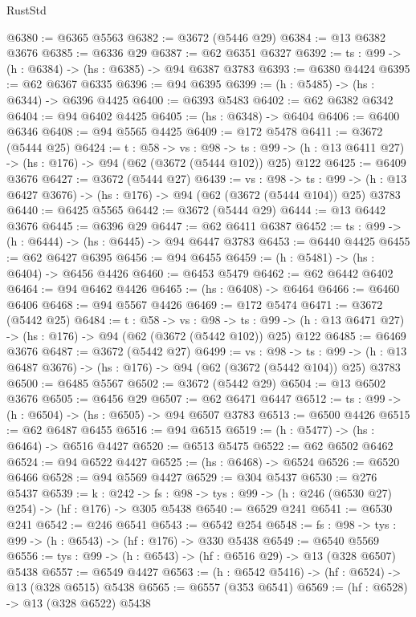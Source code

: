 \begin{lexlean}{RustStd}
\begin{coremodule}
@6380 := @6365 @5563
@6382 := @3672 (@5446 @29)
@6384 := @13 @6382 @3676
@6385 := @6336 @29
@6387 := @62 @6351 @6327
@6392 := {ts : @99} -> (h : @6384) -> (hs : @6385) -> @94 @6387 @3783
@6393 := @6380 @4424
@6395 := @62 @6367 @6335
@6396 := @94 @6395
@6399 := (h : @5485) -> (hs : @6344) -> @6396 @4425
@6400 := @6393 @5483
@6402 := @62 @6382 @6342
@6404 := @94 @6402 @4425
@6405 := (hs : @6348) -> @6404
@6406 := @6400 @6346
@6408 := @94 @5565 @4425
@6409 := @172 @5478
@6411 := @3672 (@5444 @25)
@6424 := {t : @58} ->
  {vs : @98} ->
  {ts : @99} -> (h : @13 @6411 @27) -> (hs : @176) -> @94 (@62 (@3672 (@5444 @102)) @25) @122
@6425 := @6409 @3676
@6427 := @3672 (@5444 @27)
@6439 := {vs : @98} ->
  {ts : @99} -> (h : @13 @6427 @3676) -> (hs : @176) -> @94 (@62 (@3672 (@5444 @104)) @25) @3783
@6440 := @6425 @5565
@6442 := @3672 (@5444 @29)
@6444 := @13 @6442 @3676
@6445 := @6396 @29
@6447 := @62 @6411 @6387
@6452 := {ts : @99} -> (h : @6444) -> (hs : @6445) -> @94 @6447 @3783
@6453 := @6440 @4425
@6455 := @62 @6427 @6395
@6456 := @94 @6455
@6459 := (h : @5481) -> (hs : @6404) -> @6456 @4426
@6460 := @6453 @5479
@6462 := @62 @6442 @6402
@6464 := @94 @6462 @4426
@6465 := (hs : @6408) -> @6464
@6466 := @6460 @6406
@6468 := @94 @5567 @4426
@6469 := @172 @5474
@6471 := @3672 (@5442 @25)
@6484 := {t : @58} ->
  {vs : @98} ->
  {ts : @99} -> (h : @13 @6471 @27) -> (hs : @176) -> @94 (@62 (@3672 (@5442 @102)) @25) @122
@6485 := @6469 @3676
@6487 := @3672 (@5442 @27)
@6499 := {vs : @98} ->
  {ts : @99} -> (h : @13 @6487 @3676) -> (hs : @176) -> @94 (@62 (@3672 (@5442 @104)) @25) @3783
@6500 := @6485 @5567
@6502 := @3672 (@5442 @29)
@6504 := @13 @6502 @3676
@6505 := @6456 @29
@6507 := @62 @6471 @6447
@6512 := {ts : @99} -> (h : @6504) -> (hs : @6505) -> @94 @6507 @3783
@6513 := @6500 @4426
@6515 := @62 @6487 @6455
@6516 := @94 @6515
@6519 := (h : @5477) -> (hs : @6464) -> @6516 @4427
@6520 := @6513 @5475
@6522 := @62 @6502 @6462
@6524 := @94 @6522 @4427
@6525 := (hs : @6468) -> @6524
@6526 := @6520 @6466
@6528 := @94 @5569 @4427
@6529 := @304 @5437
@6530 := @276 @5437
@6539 := {k : @242} ->
  {fs : @98} -> {tys : @99} -> (h : @246 (@6530 @27) @254) -> (hf : @176) -> @305 @5438
@6540 := @6529 @241
@6541 := @6530 @241
@6542 := @246 @6541
@6543 := @6542 @254
@6548 := {fs : @98} -> {tys : @99} -> (h : @6543) -> (hf : @176) -> @330 @5438
@6549 := @6540 @5569
@6556 := {tys : @99} -> (h : @6543) -> (hf : @6516 @29) -> @13 (@328 @6507) @5438
@6557 := @6549 @4427
@6563 := (h : @6542 @5416) -> (hf : @6524) -> @13 (@328 @6515) @5438
@6565 := @6557 (@353 @6541)
@6569 := (hf : @6528) -> @13 (@328 @6522) @5438

\end{coremodule}
\end{lexlean}

